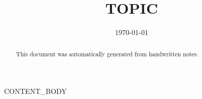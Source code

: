 \documentclass[11pt]{article}
\title{{{TOPIC}}}
\author{}
\date{\today}
\begin{document}
\maketitle

\begin{abstract}
This document was automatically generated from handwritten notes.
\end{abstract}

{{CONTENT_BODY}}
\end{document}
